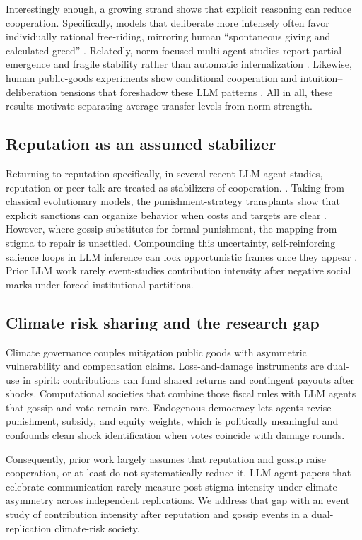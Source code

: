 Interestingly enough, a growing strand shows that explicit reasoning can reduce cooperation.
Specifically, models that deliberate more intensely often favor individually rational free-riding, mirroring human ``spontaneous giving and calculated greed'' .
Relatedly, norm-focused multi-agent studies report partial emergence and fragile stability rather than automatic internalization .
Likewise, human public-goods experiments show conditional cooperation and intuition--deliberation tensions that foreshadow these LLM patterns .
All in all, these results motivate separating average transfer levels from norm strength.

\subsection{Reputation as an assumed stabilizer}

Returning to reputation specifically, in several recent LLM-agent studies, reputation or peer talk are treated as stabilizers of cooperation. .
Taking from classical evolutionary models, the punishment-strategy transplants  show that explicit sanctions can organize behavior when costs and targets are clear .
However, where gossip substitutes for formal punishment, the mapping from stigma to repair is unsettled.
Compounding this uncertainty, self-reinforcing salience loops in LLM inference can lock opportunistic frames once they appear .
Prior LLM work rarely event-studies contribution intensity after negative social marks under forced institutional partitions.

\subsection{Climate risk sharing and the research gap}

Climate governance couples mitigation public goods with asymmetric vulnerability and compensation claims.
Loss-and-damage instruments are dual-use in spirit: contributions can fund shared returns and contingent payouts after shocks.
Computational societies that combine those fiscal rules with LLM agents that gossip and vote remain rare.
Endogenous democracy lets agents revise punishment, subsidy, and equity weights, which is politically meaningful and confounds clean shock identification when votes coincide with damage rounds.

Consequently, prior work largely assumes that reputation and gossip raise cooperation, or at least do not systematically reduce it.
LLM-agent papers that celebrate communication rarely measure post-stigma intensity under climate asymmetry across independent replications.
We address that gap with an event study of contribution intensity after reputation and gossip events in a dual-replication climate-risk society.
